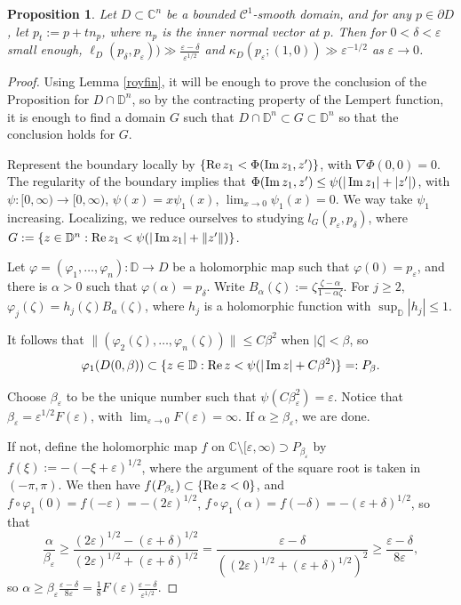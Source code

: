 \documentclass[a4paper,12pt]{amsart}
\def\D{\mathbb D}
\def\C{\mathbb C}
\newtheorem{prop}[thm]{Proposition}
\renewcommand{\Im}{\operatorname{\rm{Im}}}
\renewcommand{\Re}{\operatorname{\rm{Re}}}
\newcommand{\eps}{\varepsilon}
\begin{document}
\begin{prop}
\label{C1}
Let $D \subset \C^n$ be a bounded $\mathcal C^{1}$-smooth  domain, and
for any $p\in \partial D$, let $p_t := p+t n_p$, where $n_p$ is the inner normal vector at $p$. Then for
$0< \delta < \eps$ small enough, $\ell_D(p_\delta,p_\eps)) \gg \frac{\eps-\delta}{\eps^{1/2}}$ and $\kappa_D (p_\eps; (1,0))\gg \eps^{-1/2}$
as $\eps\to0$.
\end{prop}

\begin{proof}
Using Lemma \ref{royfin}, it will be enough to prove the conclusion of the Proposition for  $D \cap \D^n$,
so by the contracting property of the Lempert function, 
it is enough to find a domain $G$ such that  $D \cap \D^n \subset G \subset \D^n$
so that the conclusion holds for $G$.

Represent the boundary locally by $\{ \Re z_1 < \Phi (\Im z_1, z')\}$,
with $\nabla \Phi(0,0)=0$.
The regularity of the boundary  implies that
$\Phi (\Im z_1, z') \le \psi(|\Im z_1|+|z'|)$, with $\psi: [0,\infty) \longrightarrow [0,\infty)$,
$\psi(x)=x\psi_1(x)$, $\lim_{x\to0}\psi_1(x)=0$. We way take $\psi_1$ increasing.
Localizing, we reduce ourselves to studying $l_G(p_\eps,p_\delta)$,
where $G:= \{ z \in \D^n: \Re z_1 < \psi(|\Im z_1|+\|z'\|) \}$.

Let $\varphi=(\varphi_1, \dots, \varphi_n): \D \longrightarrow D$ be 
a holomorphic map such that $\varphi (0)=  p_\eps$,
and there is $\alpha>0$ such that $\varphi(\alpha)= p_\delta$. 
Write $B_\alpha (\zeta):= \zeta \frac{\zeta-\alpha}{1-\alpha \zeta}$.
For $j\ge 2$, $\varphi_j(\zeta) = h_j(\zeta) B_\alpha (\zeta)$,
 where $h_j$ is a holomorphic function with $\sup_{\D} |h_j| \le 1$.

It follows that $\|(\varphi_2(\zeta),\dots,\varphi_n(\zeta))\|\le C \beta^2$ when $|\zeta|<\beta$,
so
\[
\varphi_1(D(0,\beta)) \subset
\{ z\in \D: \Re z < \psi(|\Im z|+C\beta^2)\}=:P_\beta.
\]

Choose $\beta_\eps$ to be the unique number such that
$\psi(C \beta_\eps^2)=\eps$.  Notice that $\beta_\eps = \eps^{1/2} F(\eps)$, with $\lim_{\eps\to0} F(\eps)=\infty$. If $\alpha\ge \beta_\eps$, we are done.

If not, define the holomorphic map $f$ on $\C\setminus  [\eps,\infty) \supset P_{\beta_\eps}$
by $f(\xi):=-(-\xi+\eps)^{1/2}$,
where the argument of the square root is taken in $(-\pi,\pi)$.
We then have $f(P_{\beta_\eps})\subset \{\Re z <0\}$, and 
$f\circ \varphi_1 (0) = f(-\eps)= - (2\eps)^{1/2}$,
$f\circ \varphi_1 (\alpha) = f(-\delta)= - (\eps+\delta)^{1/2}$,
so that
\[
\frac{\alpha}{\beta_\eps} \ge
\frac{(2\eps)^{1/2}-(\eps+\delta)^{1/2}}{(2\eps)^{1/2}+(\eps+\delta)^{1/2}}
=
\frac{\eps-\delta}{((2\eps)^{1/2}+(\eps+\delta)^{1/2})^2}
\ge
\frac{\eps-\delta}{8\eps} ,
\]
so $\alpha \ge \beta_\eps \frac{\eps-\delta}{8\eps} = \frac18 F(\eps)\frac{\eps-\delta}{\eps^{1/2}}$.


\end{proof}
\end{document}
